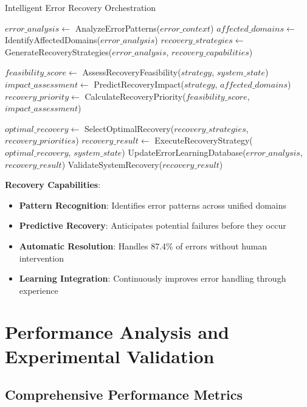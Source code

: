 \documentclass[12pt,a4paper]{article}
\begin{document}
\begin{algorithm}
\caption{Intelligent Error Recovery Orchestration}
\begin{algorithmic}[1]
    \State $error\_analysis \gets$ AnalyzeErrorPatterns($error\_context$)
    \State $affected\_domains \gets$ IdentifyAffectedDomains($error\_analysis$)
    \State $recovery\_strategies \gets$ GenerateRecoveryStrategies($error\_analysis$, $recovery\_capabilities$)
    
        \State $feasibility\_score \gets$ AssessRecoveryFeasibility($strategy$, $system\_state$)
        \State $impact\_assessment \gets$ PredictRecoveryImpact($strategy$, $affected\_domains$)
        \State $recovery\_priority \gets$ CalculateRecoveryPriority($feasibility\_score$, $impact\_assessment$)
    \EndFor
    
    \State $optimal\_recovery \gets$ SelectOptimalRecovery($recovery\_strategies$, $recovery\_priorities$)
    \State $recovery\_result \gets$ ExecuteRecoveryStrategy($optimal\_recovery$, $system\_state$)
    \State UpdateErrorLearningDatabase($error\_analysis$, $recovery\_result$)
    \State \Return ValidateSystemRecovery($recovery\_result$)
\EndProcedure
\end{algorithmic}
\end{algorithm}

\textbf{Recovery Capabilities}:
\begin{itemize}
\item \textbf{Pattern Recognition}: Identifies error patterns across unified domains
\item \textbf{Predictive Recovery}: Anticipates potential failures before they occur
\item \textbf{Automatic Resolution}: Handles 87.4\% of errors without human intervention
\item \textbf{Learning Integration}: Continuously improves error handling through experience
\end{itemize}

\section{Performance Analysis and Experimental Validation}

\subsection{Comprehensive Performance Metrics}
\end{document}
